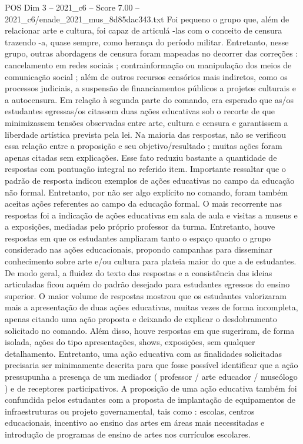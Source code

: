 \begin{textsample}{POS Dim 3 – 2021\_c6 – Score 7.00 – 2021\_c6/enade\_2021\_mus\_8d85dac343.txt}
Foi pequeno o grupo que, além de relacionar arte e cultura, foi capaz de articulá -las com o conceito de censura trazendo -a, quase sempre, como herança do período militar.
Entretanto, nesse grupo, outras abordagens de censura foram mapeadas no decorrer das correções : cancelamento em redes sociais ; contrainformação ou manipulação dos meios de comunicação social ; além de outros recursos censórios mais indiretos, como os processos judiciais, a suspensão de financiamentos públicos a projetos culturais e a autocensura.
Em relação à segunda parte do comando, era esperado que as/os estudantes egressas/os citassem duas ações educativas sob o recorte de que minimizassem tensões observadas entre arte, cultura e censura e garantissem a liberdade artística prevista pela lei.
Na maioria das respostas, não se verificou essa relação entre a proposição e seu objetivo/resultado ; muitas ações foram apenas citadas sem explicações.
Esse fato reduziu bastante a quantidade de respostas com pontuação integral no referido item.
Importante ressaltar que o padrão de resposta indicou exemplos de ações educativas no campo da educação não formal.
Entretanto, por não ser algo explícito no comando, foram também aceitas ações referentes ao campo da educação formal.
O mais recorrente nas respostas foi a indicação de ações educativas em sala de aula e visitas a museus e a exposições, mediadas pelo próprio professor da turma.
Entretanto, houve respostas em que os estudantes ampliaram tanto o espaço quanto o grupo considerado nas ações educacionais, propondo campanhas para disseminar conhecimento sobre arte e/ou cultura para plateia maior do que a de estudantes.
De modo geral, a fluidez do texto das respostas e a consistência das ideias articuladas ficou aquém do padrão desejado para estudantes egressos do ensino superior.
O maior volume de respostas mostrou que os estudantes valorizaram mais a apresentação de duas ações educativas, muitas vezes de forma incompleta, apenas citando uma ação proposta e deixando de explicar o desdobramento solicitado no comando.
Além disso, houve respostas em que sugeriram, de forma isolada, ações do tipo apresentações, shows, exposições, sem qualquer detalhamento.
Entretanto, uma ação educativa com as finalidades solicitadas precisaria ser minimamente descrita para que fosse possível identificar que a ação pressupunha a presença de um mediador ( professor / arte educador / museólogo ) e de receptores participativos.
A proposição de uma ação educativa também foi confundida pelos estudantes com a proposta de implantação de equipamentos de infraestruturas ou projeto governamental, tais como : escolas, centros educacionais, incentivo ao ensino das artes em áreas mais necessitadas e introdução de programas de ensino de artes nos currículos escolares.

\end{textsample}
